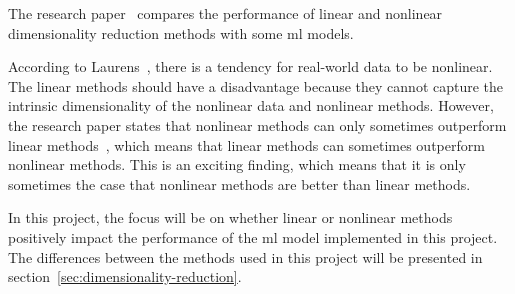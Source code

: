 The research paper~\cite{dimensionality-reduction-comparative-review} compares the performance of linear and nonlinear dimensionality reduction methods with some \gls{ml} models. 

According to Laurens~\cite{dimensionality-reduction-comparative-review}, there is a tendency for real-world data to be nonlinear. The linear methods should have a disadvantage because they cannot capture the intrinsic dimensionality of the nonlinear data and nonlinear methods. However, the research paper states that nonlinear methods can only sometimes outperform linear methods~\cite{dimensionality-reduction-comparative-review}, which means that linear methods can sometimes outperform nonlinear methods. This is an exciting finding, which means that it is only sometimes the case that nonlinear methods are better than linear methods. 

In this project, the focus will be on whether linear or nonlinear methods positively impact the performance of the \gls{ml} model implemented in this project. The differences between the methods used in this project will be presented in section~\ref{sec:dimensionality-reduction}.

 


